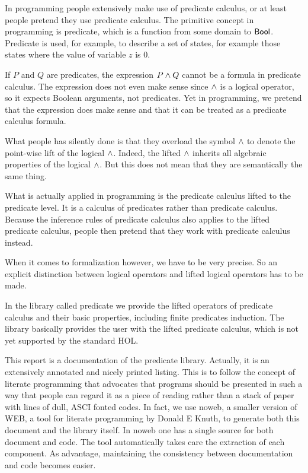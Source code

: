 In programming people extensively make use of predicate calculus, or
at least people pretend they use predicate calculus. The primitive
concept in programming is predicate, which is a function from some
domain to ${\sf Bool}$. Predicate is used, for example, to describe a set
of states, for example those states where the value of variable $z$ is
0.

If $P$ and $Q$ are predicates, the expression $P\wedge Q$ cannot be a
formula in predicate calculus. The expression does not even make sense
since $\wedge$ is a logical operator, so it expects Boolean arguments,
not predicates. Yet in programming, we pretend that the expression
does make sense and that it can be treated as a predicate calculus
formula.

What people has silently done is that they overload the symbol $\wedge$
to denote the point-wise lift of the logical $\wedge$. Indeed, the
lifted $\wedge$ inherits all algebraic properties of the logical $\wedge$.
But this does not mean that they are semantically the same thing.

What is actually applied in programming is the predicate calculus
lifted to the predicate level. It is a calculus of predicates rather
than predicate calculus. Because the inference rules of predicate
calculus also applies to the lifted predicate calculus, people then
pretend that they work with predicate calculus instead.

When it comes to formalization however, we have to be very precise. So
an explicit distinction between logical operators and lifted logical
operators has to be made.

In the library called \code{}predicate\edoc{} we provide the lifted operators of
predicate calculus and their basic properties, including finite
predicates induction. The library basically provides the user with the
lifted predicate calculus, which is not yet supported by the standard
HOL.

This report is a documentation of the \code{}predicate\edoc{} library. Actually,
it is an extensively annotated and nicely printed listing. This is to
follow the concept of literate programming that advocates that
programs should be presented in such a way that people can regard it
as a piece of reading rather than a stack of paper with lines of dull,
ASCI fonted codes. In fact, we use \code{}noweb\edoc{}, a smaller version of
\code{}WEB\edoc{}, a tool for literate programming by Donald E Knuth, to
generate both this document and the library itself. In \code{}noweb\edoc{} one
has a single source for both document and code. The tool
automatically takes care the extraction of each component. As
advantage, maintaining the consistency between documentation and code
becomes easier.

